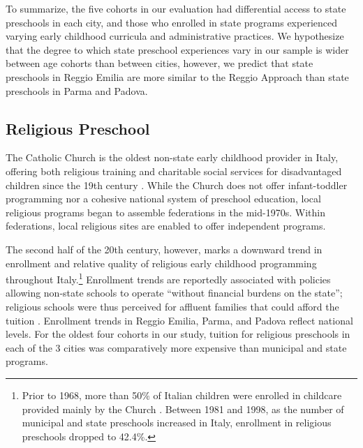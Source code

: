 To summarize, the five cohorts in our evaluation had differential access to state preschools in each city, and those who enrolled in state programs experienced varying early childhood curricula and administrative practices. We hypothesize that the degree to which state preschool experiences vary in our sample is wider between age cohorts than between cities, however, we predict that state preschools in Reggio Emilia are more similar to the Reggio Approach than state preschools in Parma and Padova. 

\subsection{Religious Preschool}

The Catholic Church is the oldest non-state early childhood provider in Italy, offering both religious training and charitable social services for disadvantaged children since the 19th century \citep{OECD_2001_Italy-Country-Note}. While the Church does not offer infant-toddler programming nor a cohesive national system of preschool education, local religious programs began to assemble federations in the mid-1970s. Within federations, local religious sites are enabled to offer independent programs. 

The second half of the 20th century, however, marks a downward trend in enrollment and relative quality of religious early childhood programming throughout Italy.\footnote{Prior to 1968, more than 50\% of Italian children were enrolled in childcare provided mainly by the Church \citep{Hohnerlein_2009_Paradox-Public-Preschools}. Between 1981 and 1998, as the number of municipal and state preschools increased in Italy, enrollment in religious preschools dropped to 42.4\%.} Enrollment trends are reportedly associated with policies allowing non-state schools to operate ``without financial burdens on the state''; religious schools were thus perceived for affluent families that could afford the tuition \citep{Ribolzi_2013_Italy,Hohnerlein_2009_Paradox-Public-Preschools}. Enrollment trends in Reggio Emilia, Parma, and Padova reflect national levels. For the oldest four cohorts in our study, tuition for religious preschools in each of the 3 cities was comparatively more expensive than municipal and state programs. 

